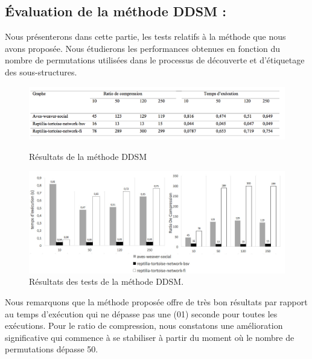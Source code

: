 	
	
	
	
	
	
	\subsection{Évaluation de la méthode DDSM :}
	
	Nous présenterons dans cette partie, les tests relatifs à la méthode que nous avons proposée. Nous étudierons les performances obtenues en fonction du nombre de permutations utilisées dans le processus de découverte et d'étiquetage des sous-structures. 
\begin{figure}[H]
	
	\includegraphics[scale=0.4]{ressources/image/grDDSM.png}
	\label{fig:perte }
	\caption{Résultats de la méthode DDSM}
\end{figure}
		\begin{figure}[H]
		\begin{center}
		 \includegraphics[scale=0.45]{ressources/image/DDSM.jpg}
			
			
			\caption{Résultats des tests de la méthode DDSM.}
			\label{fig:test-ddsm}
		\end{center}
	\end{figure}
	
	Nous remarquons que la méthode proposée offre de très bon résultats par rapport au temps d'exécution qui ne dépasse pas une (01) seconde pour toutes les exécutions. Pour le ratio de compression, nous constatons une amélioration significative qui commence à se stabiliser à partir du moment où le nombre de permutations dépasse 50. 
	

